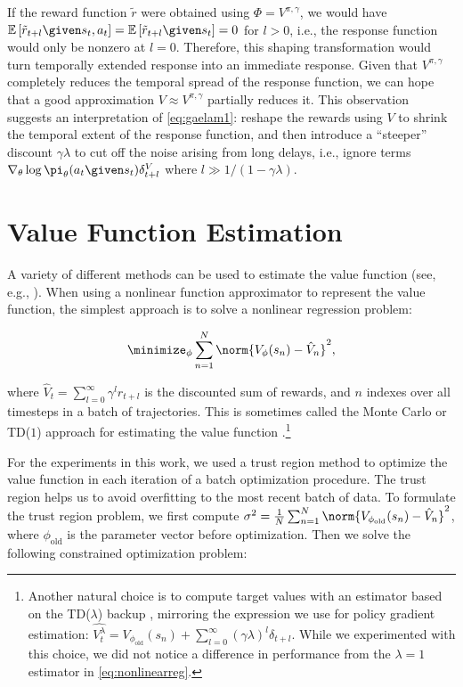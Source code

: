 If the reward function $\tilde{r}$ were obtained using $\Phi=V^{\pi,\gamma}$, we would have $\mathbb{E}\left[\tilde{r}_{t+l} \given s_t,a_t\right] = \mathbb{E}\left[\tilde{r}_{t+l} \given s_t\right] = 0$ for $l > 0$, i.e., the response function would only be nonzero at $l=0$. Therefore, this shaping transformation would turn temporally extended response into an immediate response. Given that $V^{\pi,\gamma}$ completely reduces the temporal spread of the response function, we can hope that a good approximation $V \approx V^{\pi,\gamma}$ partially reduces it. This observation suggests an interpretation of \ref{eq:gaelam1}: reshape the rewards using $V$ to shrink the temporal extent of the response function, and then introduce a ``steeper'' discount $\gamma \lambda$ to cut off the noise arising from long delays, i.e., ignore terms $\nabla_{\theta} \log \pi_{\theta}(a_t \given s_t) \delta^V_{t+l}$ where $l \gg 1/(1-\gamma \lambda)$.

\section{Value Function Estimation}

A variety of different methods can be used to estimate the value function (see, e.g., \cite{bertsekas1995dynamic}). When using a nonlinear function approximator to represent the value function, the simplest approach is to solve a nonlinear regression problem:

\begin{align}
\minimize_{\phi} \sum_{n=1}^N \norm{ V_{\phi}(s_n) - \hat{V}_n }^2,
\label{eq:nonlinearreg}
\end{align}

where $\hat{V}_t = \sum_{l=0}^{\infty} \gamma^l r_{t+l}$ is the discounted sum of rewards, and $n$ indexes over all timesteps in a batch of trajectories. This is sometimes called the Monte Carlo or TD($1$) approach for estimating the value function \citep{sutton1998introduction}.\footnote{Another natural choice is to compute target values with an estimator based on the TD($\lambda$) backup \citep{bertsekas1995dynamic,sutton1998introduction}, mirroring the expression we use for policy gradient estimation: $\hat{V^{\lambda}_t} =  V_{\phi_{\text{old}}}(s_n) + \sum_{l=0}^{\infty} (\gamma \lambda)^{l} \delta_{t+l}$.
While we experimented with this choice, we did not notice a difference in performance from the $\lambda=1$ estimator in \ref{eq:nonlinearreg}.}

For the experiments in this work, we used a trust region method to optimize the value function in each iteration of a batch optimization procedure. The trust region helps us to avoid overfitting to the most recent batch of data. To formulate the trust region problem, we first compute $\sigma^2 = \frac{1}{N} \sum_{n=1}^N \norm{ V_{\phi_{\text{old}}}(s_n) - \hat{V}_n }^2$, where $\phi_{\text{old}}$ is the parameter vector before optimization. Then we solve the following constrained optimization problem:

